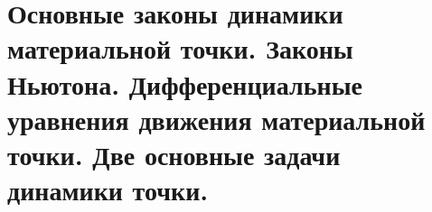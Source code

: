 \chapter{Основные законы динамики материальной точки. Законы Ньютона.
Дифференциальные уравнения движения материальной точки. Две основные задачи
динамики точки.}

\newpage
